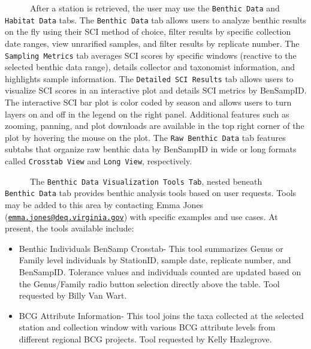 \documentclass[
]{article}
\providecommand{\tightlist}{%
  \setlength{\itemsep}{0pt}\setlength{\parskip}{0pt}}
\begin{document}
~~~~~~After a station is retrieved, the user may use the
\texttt{Benthic\ Data} and \texttt{Habitat\ Data} tabs. The
\texttt{Benthic\ Data} tab allows users to analyze benthic results on
the fly using their SCI method of choice, filter results by specific
collection date ranges, view unrarified samples, and filter results by
replicate number. The \texttt{Sampling\ Metrics} tab averages SCI scores
by specific windows (reactive to the selected benthic data range),
details collector and taxonomist information, and highlights sample
information. The \texttt{Detailed\ SCI\ Results} tab allows users to
visualize SCI scores in an interactive plot and details SCI metrics by
BenSampID. The interactive SCI bar plot is color coded by season and
allows users to turn layers on and off in the legend on the right panel.
Additional features such as zooming, panning, and plot downloads are
available in the top right corner of the plot by hovering the mouse on
the plot. The \texttt{Raw\ Benthic\ Data} tab features subtabs that
organize raw benthic data by BenSampID in wide or long formats called
\texttt{Crosstab\ View} and \texttt{Long\ View}, respectively.

~~~~~~The \texttt{Benthic\ Data\ Visualization\ Tools\ Tab}, nested
beneath \texttt{Benthic\ Data} tab provides benthic analysis tools based
on user requests. Tools may be added to this area by contacting Emma
Jones
(\href{mailto:emma.jones@deq.virginia.gov}{\nolinkurl{emma.jones@deq.virginia.gov}})
with specific examples and use cases. At present, the tools available
include:

\begin{itemize}
\tightlist
\item
  Benthic Individuals BenSamp Crosstab- This tool summarizes Genus or
  Family level individuals by StationID, sample date, replicate number,
  and BenSampID. Tolerance values and individuals counted are updated
  based on the Genus/Family radio button selection directly above the
  table. Tool requested by Billy Van Wart.
\item
  BCG Attribute Information- This tool joins the taxa collected at the
  selected station and collection window with various BCG attribute
  levels from different regional BCG projects. Tool requested by Kelly
  Hazlegrove.
\end{itemize}
\end{document}
